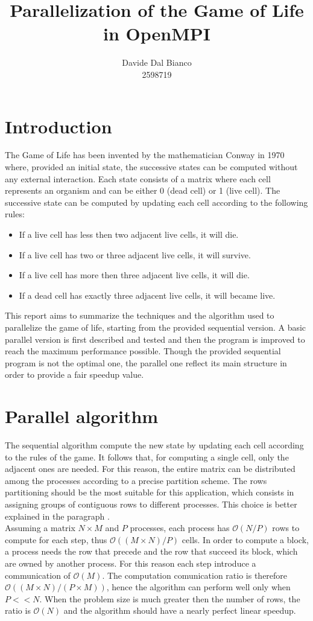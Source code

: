 \documentclass{article}
\title{Parallelization of the Game of Life in OpenMPI}
\author{Davide Dal Bianco \\ 2598719}
\begin{document}
\maketitle

\section{Introduction}
The Game of Life has been invented by the mathematician Conway in 1970 where, provided an initial state, the successive states can be computed without any external interaction. Each state consists of a matrix where each cell represents an organism and can be either 0 (dead cell) or 1 (live cell). The successive state can be computed by updating each cell according to the following rules:
\begin{itemize}
    \item If a live cell has less then two adjacent live cells, it will die.
    \item If a live cell has two or three adjacent live cells, it will survive.
    \item If a live cell has more then three adjacent live cells, it will die.
    \item If a dead cell has exactly three adjacent live cells, it will became live.
\end{itemize}
This report aims to summarize the techniques and the algorithm used to parallelize the game of life, starting from the provided sequential version. A basic parallel version is first described and tested and then the program is improved to reach the maximum performance possible. Though the provided sequential program is not the optimal one, the parallel one reflect its main structure in order to provide a fair speedup value.

\section{Parallel algorithm} \label{sec:parallelalgorithm}
The sequential algorithm compute the new state by updating each cell according to the rules of the game. It follows that, for computing a single cell, only the adjacent ones are needed. For this reason, the entire matrix can be distributed among the processes according to a precise partition scheme. The rows partitioning should be the most suitable for this application, which consists in assigning groups of contiguous rows to different processes. This choice is better explained in the paragraph . \\
Assuming a matrix $N \times M$ and $P$ processes, each process has $\mathcal{O}(N / P)$ rows to compute for each step, thus $\mathcal{O}((M \times N) / P)$ cells. In order to compute a block, a process needs the row that precede and the row that succeed its block, which are owned by another process. For this reason each step introduce a communication of $\mathcal{O}(M)$. The computation comunication ratio is therefore $\mathcal{O}((M \times N) / (P \times M))$, hence the algorithm can perform well only when $P << N$. When the problem size is much greater then the number of rows, the ratio is $\mathcal{O}(N)$ and the algorithm should have a nearly perfect linear speedup.
\end{document}
